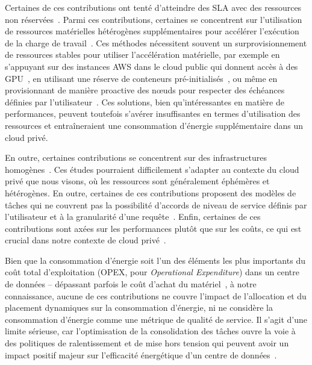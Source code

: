 Certaines de ces contributions ont tenté d'atteindre des \gls{SLA} avec des ressources non réservées~\cite{gujaratiSwayamDistributedAutoscaling2017, zhangMArkExploitingCloud, mampageDeadlineawareDynamicResource2021, singhviAtollScalableLowLatency2021, handaoui2020releaser, handaoui2020salamander, yalles2022riscless}. Parmi ces contributions, certaines se concentrent sur l'utilisation de ressources matérielles hétérogènes supplémentaires pour accélérer l'exécution de la charge de travail~\cite{zhangMArkExploitingCloud, lingPigeonDynamicEfficient2019, yangINFlessNativeServerless2022}. Ces méthodes nécessitent souvent un surprovisionnement de ressources stables pour utiliser l'accélération matérielle, par exemple en s'appuyant sur des instances \gls{AWS} dans le cloud public qui donnent accès à des \gls{GPU}~\cite{zhangMArkExploitingCloud}, en utilisant une réserve de conteneurs pré-initialisés~\cite{lingPigeonDynamicEfficient2019}, ou même en provisionnant de manière proactive des nœuds pour respecter des échéances définies par l'utilisateur~\cite{singhviAtollScalableLowLatency2021}. Ces solutions, bien qu'intéressantes en matière de performances, peuvent toutefois s'avérer insuffisantes en termes d'utilisation des ressources et entraîneraient une consommation d'énergie supplémentaire dans un cloud privé.

En outre, certaines contributions se concentrent sur des infrastructures homogènes~\cite{gujaratiSwayamDistributedAutoscaling2017, sureshENSUREEfficientScheduling2020, mampageDeadlineawareDynamicResource2021, singhviAtollScalableLowLatency2021, yangINFlessNativeServerless2022}. Ces études pourraient difficilement s'adapter au contexte du cloud privé que nous visons, où les ressources sont généralement éphémères et hétérogènes. En outre, certaines de ces contributions proposent des modèles de tâches qui ne couvrent pas la possibilité d'accords de niveau de service définis par l'utilisateur et à la granularité d'une requête~\cite{sureshENSUREEfficientScheduling2020, lingPigeonDynamicEfficient2019}. Enfin, certaines de ces contributions sont axées sur les performances plutôt que sur les coûts, ce qui est crucial dans notre contexte de cloud privé~\cite{gujaratiSwayamDistributedAutoscaling2017, lingPigeonDynamicEfficient2019, singhviAtollScalableLowLatency2021, choSLADrivenMLInference}.

Bien que la consommation d'énergie soit l'un des éléments les plus importants du coût total d'exploitation (\gls{OPEX}, pour \textit{Operational Expenditure}) dans un centre de données -- dépassant parfois le coût d'achat du matériel~\cite{7279063}, à notre connaissance, aucune de ces contributions ne couvre l'impact de l'allocation et du placement dynamiques sur la consommation d'énergie, ni ne considère la consommation d'énergie comme une métrique de qualité de service. Il s'agit d'une limite sérieuse, car l'optimisation de la consolidation des tâches ouvre la voie à des politiques de ralentissement et de mise hors tension qui peuvent avoir un impact positif majeur sur l'efficacité énergétique d'un centre de données~\cite{chaurasiaComprehensiveSurveyEnergyaware2021}.

